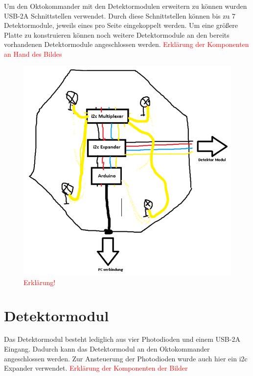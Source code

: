Um den Oktokommander mit den Detektormodulen erweitern zu können wurden USB-2A Schnittstellen verwendet. Durch diese Schnittstellen können bis zu 7 Detektormodule, jeweils eines pro Seite  eingekoppelt werden. Um eine größere Platte zu konstruieren können noch weitere Detektormodule an den bereits vorhandenen Detektormodule angeschlossen werden.
\textcolor{red}{Erklärung der Komponenten an Hand des Bildes}

\begin{figure}[h]
	\centering
	\includegraphics[scale=0.8]{figures/PrinzipskizzeOktokommander.png} 
	\caption{\textcolor{red}{Erklärung!}}
	\label{fig:PrinzipskizzeOktokommander}
\end{figure}


\section{Detektormodul}
\label{sec:Detektormodul}

Das Detektormodul besteht lediglich aus vier Photodioden und einem USB-2A Eingang. Dadurch kann das Detektormodul an den Oktokommander angeschlossen werden. Zur Ansteuerung der Photodioden wurde auch hier ein i2c Expander verwendet. 
\textcolor{red}{Erklärung der Komponenten der Bilder}

